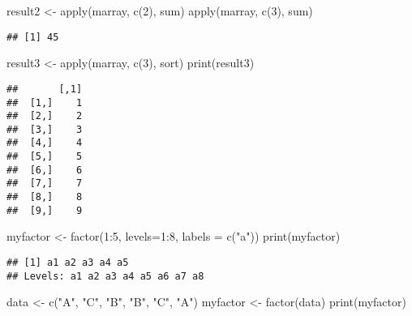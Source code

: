 \documentclass[
]{article}
\newenvironment{Shaded}{\begin{snugshade}}{\end{snugshade}}
\newcommand{\AttributeTok}[1]{\textcolor[rgb]{0.77,0.63,0.00}{#1}}
\newcommand{\DecValTok}[1]{\textcolor[rgb]{0.00,0.00,0.81}{#1}}
\newcommand{\FunctionTok}[1]{\textcolor[rgb]{0.00,0.00,0.00}{#1}}
\newcommand{\NormalTok}[1]{#1}
\newcommand{\OtherTok}[1]{\textcolor[rgb]{0.56,0.35,0.01}{#1}}
\newcommand{\SpecialCharTok}[1]{\textcolor[rgb]{0.00,0.00,0.00}{#1}}
\newcommand{\StringTok}[1]{\textcolor[rgb]{0.31,0.60,0.02}{#1}}
\begin{document}
\begin{Shaded}
\begin{Highlighting}[]
\NormalTok{result2 }\OtherTok{\textless{}{-}} \FunctionTok{apply}\NormalTok{(marray, }\FunctionTok{c}\NormalTok{(}\DecValTok{2}\NormalTok{), sum)}
\FunctionTok{apply}\NormalTok{(marray, }\FunctionTok{c}\NormalTok{(}\DecValTok{3}\NormalTok{), sum)}
\end{Highlighting}
\end{Shaded}

\begin{verbatim}
## [1] 45
\end{verbatim}

\begin{Shaded}
\begin{Highlighting}[]
\NormalTok{result3 }\OtherTok{\textless{}{-}} \FunctionTok{apply}\NormalTok{(marray, }\FunctionTok{c}\NormalTok{(}\DecValTok{3}\NormalTok{), sort)}
\FunctionTok{print}\NormalTok{(result3)}
\end{Highlighting}
\end{Shaded}

\begin{verbatim}
##       [,1]
##  [1,]    1
##  [2,]    2
##  [3,]    3
##  [4,]    4
##  [5,]    5
##  [6,]    6
##  [7,]    7
##  [8,]    8
##  [9,]    9
\end{verbatim}

\begin{Shaded}
\begin{Highlighting}[]
\NormalTok{myfactor }\OtherTok{\textless{}{-}} \FunctionTok{factor}\NormalTok{(}\DecValTok{1}\SpecialCharTok{:}\DecValTok{5}\NormalTok{, }\AttributeTok{levels=}\DecValTok{1}\SpecialCharTok{:}\DecValTok{8}\NormalTok{, }\AttributeTok{labels =} \FunctionTok{c}\NormalTok{(}\StringTok{"a"}\NormalTok{))}
\FunctionTok{print}\NormalTok{(myfactor)}
\end{Highlighting}
\end{Shaded}

\begin{verbatim}
## [1] a1 a2 a3 a4 a5
## Levels: a1 a2 a3 a4 a5 a6 a7 a8
\end{verbatim}

\begin{Shaded}
\begin{Highlighting}[]
\NormalTok{data }\OtherTok{\textless{}{-}} \FunctionTok{c}\NormalTok{(}\StringTok{"A"}\NormalTok{, }\StringTok{"C"}\NormalTok{, }\StringTok{"B"}\NormalTok{, }\StringTok{"B"}\NormalTok{, }\StringTok{"C"}\NormalTok{, }\StringTok{"A"}\NormalTok{)}
\NormalTok{myfactor }\OtherTok{\textless{}{-}} \FunctionTok{factor}\NormalTok{(data)}
\FunctionTok{print}\NormalTok{(myfactor)}
\end{Highlighting}
\end{Shaded}
\end{document}
